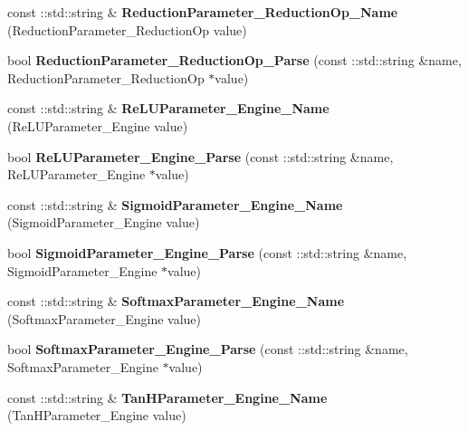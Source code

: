 \begin{DoxyCompactItemize}
const \+::std\+::string \& {\bfseries Reduction\+Parameter\+\_\+\+Reduction\+Op\+\_\+\+Name} (Reduction\+Parameter\+\_\+\+Reduction\+Op value)
\item 
\mbox{\label{namespacecaffe_a27ce00ee9a104abac4aeeb428bbd3e50}} 
bool {\bfseries Reduction\+Parameter\+\_\+\+Reduction\+Op\+\_\+\+Parse} (const \+::std\+::string \&name, Reduction\+Parameter\+\_\+\+Reduction\+Op $\ast$value)
\item 
\mbox{\label{namespacecaffe_a6f077a94fe1703021cad41457633d769}} 
const \+::std\+::string \& {\bfseries Re\+L\+U\+Parameter\+\_\+\+Engine\+\_\+\+Name} (Re\+L\+U\+Parameter\+\_\+\+Engine value)
\item 
\mbox{\label{namespacecaffe_a2a2b5c4c481e4291d78fb48ed4aa3377}} 
bool {\bfseries Re\+L\+U\+Parameter\+\_\+\+Engine\+\_\+\+Parse} (const \+::std\+::string \&name, Re\+L\+U\+Parameter\+\_\+\+Engine $\ast$value)
\item 
\mbox{\label{namespacecaffe_a7bb33983d070db1b77640cee2fad1a9d}} 
const \+::std\+::string \& {\bfseries Sigmoid\+Parameter\+\_\+\+Engine\+\_\+\+Name} (Sigmoid\+Parameter\+\_\+\+Engine value)
\item 
\mbox{\label{namespacecaffe_a1ec16a2719b353bc863144ffc69dd16b}} 
bool {\bfseries Sigmoid\+Parameter\+\_\+\+Engine\+\_\+\+Parse} (const \+::std\+::string \&name, Sigmoid\+Parameter\+\_\+\+Engine $\ast$value)
\item 
\mbox{\label{namespacecaffe_ac69a743add5e54a9a0d5bd9069497992}} 
const \+::std\+::string \& {\bfseries Softmax\+Parameter\+\_\+\+Engine\+\_\+\+Name} (Softmax\+Parameter\+\_\+\+Engine value)
\item 
\mbox{\label{namespacecaffe_a8be39d785e9489fded8e529af63e9076}} 
bool {\bfseries Softmax\+Parameter\+\_\+\+Engine\+\_\+\+Parse} (const \+::std\+::string \&name, Softmax\+Parameter\+\_\+\+Engine $\ast$value)
\item 
\mbox{\label{namespacecaffe_a84849f2c7c8af84c10a2a6e6c310de9f}} 
const \+::std\+::string \& {\bfseries Tan\+H\+Parameter\+\_\+\+Engine\+\_\+\+Name} (Tan\+H\+Parameter\+\_\+\+Engine value)

\end{DoxyCompactItemize}
